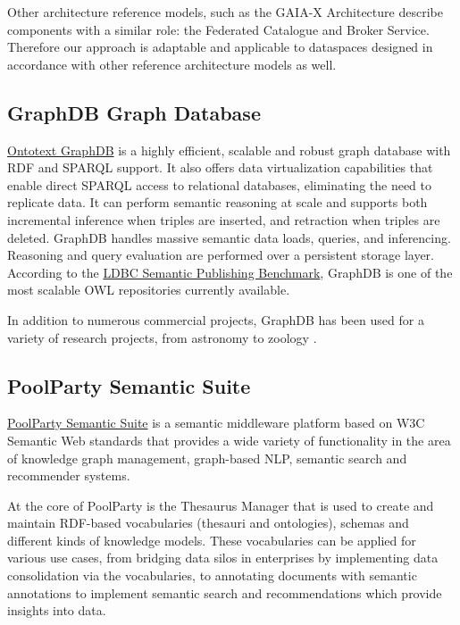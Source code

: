 \documentclass[
  super,
  preprint,
  3p]{elsarticle}
\begin{document}
Other architecture reference models, such as the GAIA-X Architecture
\citep{GaiaXArchitectureDocument2022} describe components with a similar
role: the Federated Catalogue and Broker Service. Therefore our approach
is adaptable and applicable to dataspaces designed in accordance with
other reference architecture models as well.

\subsection{GraphDB Graph Database}\label{graphdb-graph-database}

\href{https://graphdb.ontotext.com/}{Ontotext GraphDB} is a highly
efficient, scalable and robust graph database with RDF and SPARQL
support. It also offers data virtualization capabilities that enable
direct SPARQL access to relational databases, eliminating the need to
replicate data. It can perform semantic reasoning at scale and supports
both incremental inference when triples are inserted, and retraction
when triples are deleted. GraphDB handles massive semantic data loads,
queries, and inferencing. Reasoning and query evaluation are performed
over a persistent storage layer. According to the
\href{https://ldbcouncil.org/benchmarks/spb/}{LDBC Semantic Publishing
Benchmark}, GraphDB is one of the most scalable OWL repositories
currently available.

In addition to numerous commercial projects, GraphDB has been used for a
variety of research projects, from astronomy to zoology
\citep{alexievDiverseUsesSemantic2021}.

\subsection{PoolParty Semantic Suite}\label{poolparty-semantic-suite}

\href{PoolParty\%20Semantic\%20Suite}{PoolParty Semantic Suite} is a
semantic middleware platform based on W3C Semantic Web standards that
provides a wide variety of functionality in the area of knowledge graph
management, graph-based NLP, semantic search and recommender systems.

At the core of PoolParty is the Thesaurus Manager that is used to create
and maintain RDF-based vocabularies (thesauri and ontologies), schemas
and different kinds of knowledge models. These vocabularies can be
applied for various use cases, from bridging data silos in enterprises
by implementing data consolidation via the vocabularies, to annotating
documents with semantic annotations to implement semantic search and
recommendations which provide insights into data.
\end{document}
